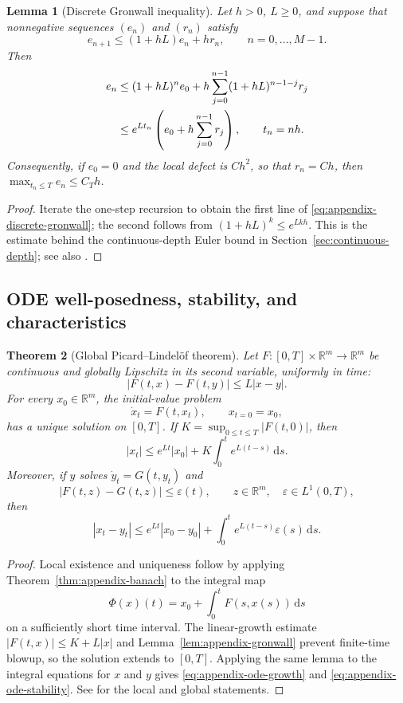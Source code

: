 \documentclass[11pt]{amsart}
\numberwithin{equation}{section}
\theoremstyle{plain}
\newtheorem{theorem}{Theorem}[section]
\newtheorem{lemma}[theorem]{Lemma}
\newcommand{\R}{\mathbb{R}}
\newcommand{\dd}{\,\mathrm{d}}
\newcommand{\abs}[1]{\left\lvert#1\right\rvert}
\begin{document}
\begin{lemma}[Discrete Gronwall inequality]
\label{lem:appendix-discrete-gronwall}
Let $h>0$, $L\geq0$, and suppose that nonnegative sequences $(e_n)$ and
$(r_n)$ satisfy
\[
 e_{n+1}\leq(1+hL)e_n+hr_n,
 \qquad n=0,\ldots,M-1.
\]
Then
\begin{align}
 e_n
 &\leq(1+hL)^ne_0
 +h\sum_{j=0}^{n-1}(1+hL)^{n-1-j}r_j\notag\\
 &\leq e^{Lt_n}\left(e_0+h\sum_{j=0}^{n-1}r_j\right),
 \qquad t_n=nh.\label{eq:appendix-discrete-gronwall}
\end{align}
Consequently, if $e_0=0$ and the local defect is $Ch^2$, so that
$r_n=Ch$, then $\max_{t_n\leq T}e_n\leq C_T h$.
\end{lemma}
\begin{proof}
Iterate the one-step recursion to obtain the first line of
\eqref{eq:appendix-discrete-gronwall}; the second follows from
$(1+hL)^k\leq e^{Lkh}$.  This is the estimate behind the continuous-depth
Euler bound in Section~\ref{sec:continuous-depth}; see also
\cite[Section~2.7]{Teschl2012}.
\end{proof}

\subsection{ODE well-posedness, stability, and characteristics}

\begin{theorem}[Global Picard--Lindel\"of theorem]
\label{thm:appendix-ode-wp}
Let $F:[0,T]\times\R^m\to\R^m$ be continuous and globally Lipschitz in its
second variable, uniformly in time:
\[
 \abs{F(t,x)-F(t,y)}\leq L\abs{x-y}.
\]
For every $x_0\in\R^m$, the initial-value problem
\begin{equation}\label{eq:appendix-ode}
 \dot x_t=F(t,x_t),\qquad x_{t=0}=x_0,
\end{equation}
has a unique solution on $[0,T]$.  If
$K=\sup_{0\leq t\leq T}\abs{F(t,0)}$, then
\begin{equation}\label{eq:appendix-ode-growth}
 \abs{x_t}\leq e^{Lt}\abs{x_0}
 +K\int_0^te^{L(t-s)}\dd s.
\end{equation}
Moreover, if $y$ solves $\dot y_t=G(t,y_t)$ and
\[
 \abs{F(t,z)-G(t,z)}\leq\varepsilon(t),
 \qquad z\in\R^m,\quad \varepsilon\in L^1(0,T),
\]
then
\begin{equation}\label{eq:appendix-ode-stability}
 \abs{x_t-y_t}
 \leq e^{Lt}\abs{x_0-y_0}
 +\int_0^te^{L(t-s)}\varepsilon(s)\dd s.
\end{equation}
\end{theorem}
\begin{proof}
Local existence and uniqueness follow by applying
Theorem~\ref{thm:appendix-banach} to the integral map
\[
 \Phi(x)(t)=x_0+\int_0^tF(s,x(s))\dd s
\]
on a sufficiently short time interval.  The linear-growth estimate
$\abs{F(t,x)}\leq K+L\abs{x}$ and
Lemma~\ref{lem:appendix-gronwall} prevent finite-time blowup, so the solution
extends to $[0,T]$.  Applying the same lemma to the integral equations for
$x$ and $y$ gives \eqref{eq:appendix-ode-growth} and
\eqref{eq:appendix-ode-stability}.  See
\cite[Theorem~2.2 and Corollary~2.6]{Teschl2012} for the local and global
statements.
\end{proof}
\end{document}
